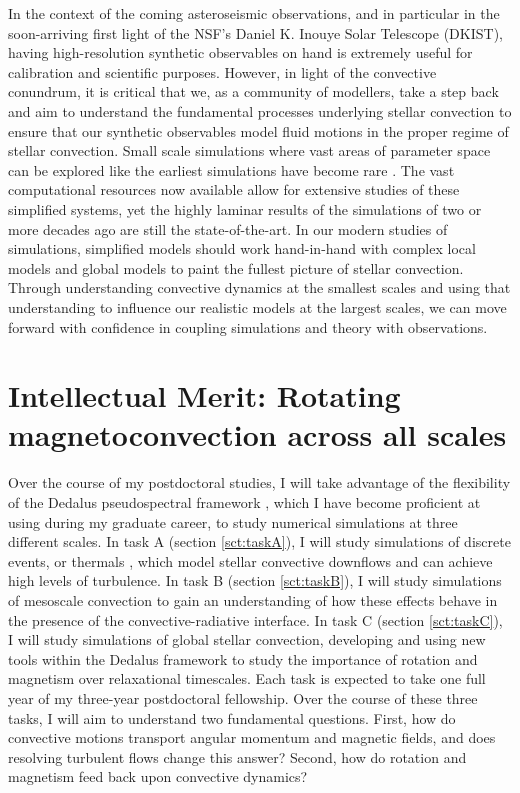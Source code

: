 \documentclass[aasms,11pt]{article}
\makeatletter
\renewcommand{\sectionmark}[1]{%
  \markboth{\ifnum \c@secnumdepth>\z@
      \thesection: \hskip 1em\relax
    \fi #1}{}}
\makeatother
\begin{document}
In the context of the coming asteroseismic observations, and in particular in the soon-arriving first light of the NSF's Daniel K. Inouye Solar Telescope (DKIST), having high-resolution synthetic observables on hand is extremely useful for calibration and scientific purposes.
However, in light of the convective conundrum, it is critical that we, as a community of modellers, take a step back and aim to understand the fundamental processes underlying stellar convection to ensure that our synthetic observables model fluid motions in the proper regime of stellar convection.
Small scale simulations where vast areas of parameter space can be explored like the earliest simulations have become rare \citep{wood&brummell2012, wood&brummell2018}.
The vast computational resources now available allow for extensive studies of these simplified systems, yet the highly laminar results of the simulations of two or more decades ago are still the state-of-the-art.
In our modern studies of simulations, simplified models \citep{brummell&all1998} should work hand-in-hand with complex local models \citep{rempel2014} and global models \citep{strugarek&all2018} to paint the fullest picture of stellar convection.
Through understanding convective dynamics at the smallest scales and using that understanding to influence our realistic models at the largest scales, we can move forward with confidence in coupling simulations and theory with observations.

\section{Intellectual Merit: Rotating magnetoconvection across all scales}
\sectionmark{Intellectual Merit}
\vspace{-6pt}

\label{sct:intellectual_merit}

Over the course of my postdoctoral studies, I will take advantage of the flexibility of the Dedalus pseudospectral framework \citep{burns&all2019}, which I have become proficient at using during my graduate career, to study numerical simulations at three different scales.
In task A (section \ref{sct:taskA}), I will study simulations of discrete events, or thermals \citep[as in ][]{andersLB2019}, which model stellar convective downflows and can achieve high levels of turbulence.
In task B (section \ref{sct:taskB}), I will study simulations of mesoscale convection \citep[as in ][]{anders&brown2017} to gain an understanding of how these effects behave in the presence of the convective-radiative interface.
In task C (section \ref{sct:taskC}), I will study simulations of global stellar convection, developing and using new tools within the Dedalus framework to study the importance of rotation and magnetism over relaxational timescales.
Each task is expected to take one full year of my three-year postdoctoral fellowship.
Over the course of these three tasks, I will aim to understand two fundamental questions.
First, how do convective motions transport angular momentum and magnetic fields, and does resolving turbulent flows change this answer?
Second, how do rotation and magnetism feed back upon convective dynamics?
\end{document}
